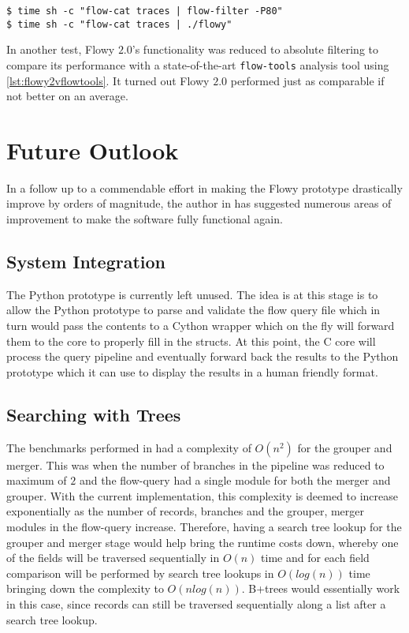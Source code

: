 \begin{lstlisting}
$ time sh -c "flow-cat traces | flow-filter -P80"
$ time sh -c "flow-cat traces | ./flowy"
\end{lstlisting}

In another test, Flowy $2.0$'s functionality was reduced to absolute filtering  to compare its performance with a state-of-the-art \texttt{flow-tools} analysis tool using \ref{lst:flowy2vflowtools}. It turned out Flowy $2.0$ performed just as comparable if not better on an average.

\section{Future Outlook}\label{sec:flowy2-future}
In a follow up to a commendable effort in making the Flowy prototype drastically improve by orders of magnitude, the author in \cite{jschauer:thesis:2011} has suggested numerous areas of improvement to make the software fully functional again.

\subsection{System Integration}\label{subsec:system-integration}
The Python prototype is currently left unused. The idea is at this stage is to allow the Python prototype to parse and validate the flow query file which in turn would pass the contents to a Cython wrapper which on the fly will forward them to the core to properly fill in the structs. At this point, the C core will process the query pipeline and eventually forward back the results to the Python prototype which it can use to display the results in a human friendly format.

\subsection{Searching with Trees}\label{subsec:search-trees}
The benchmarks performed in \cite{jschauer:thesis:2011} had a complexity of $O(n^2)$ for the grouper and merger. This was when the number of branches in the pipeline was reduced to maximum of $2$ and the flow-query had a single module for both the merger and grouper. With the current implementation, this complexity is deemed to increase exponentially as the number of records, branches and the grouper, merger modules in the flow-query increase. Therefore, having a search tree lookup for the grouper and merger stage would help bring the runtime costs down, whereby one of the fields will be traversed sequentially in $O(n)$ time and for each field comparison will be performed  by search tree lookups in $O(log(n))$ time bringing down the complexity to $O(nlog(n))$. B+trees would essentially work in this case, since records can still be traversed sequentially along a list after a search tree lookup.

